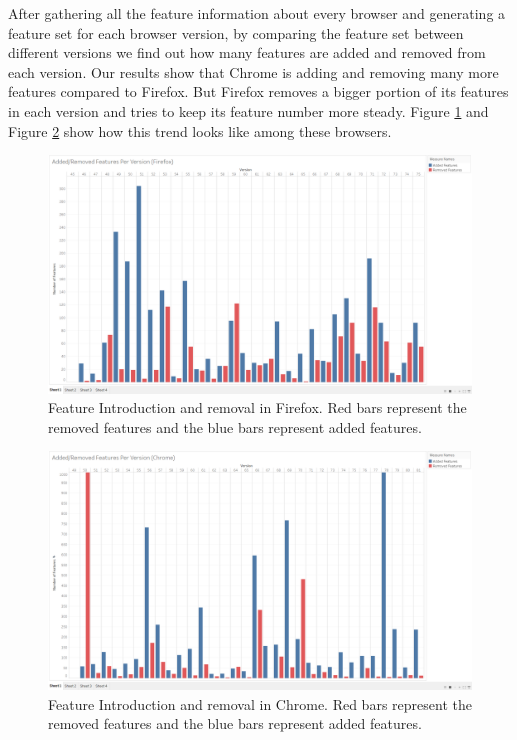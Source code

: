 After gathering all the feature information about every browser and generating a feature set for each browser version, by comparing the feature set between different versions we find out how many features are added and removed from each version. Our results show that Chrome is adding and removing many more features compared to Firefox. But Firefox removes a bigger portion of its features in each version and tries to keep its feature number more steady. Figure \ref{fig:ffaddremove} and Figure \ref{fig:chaddremove} show how this trend looks like among these browsers.

\begin{figure}[ht]
    \centering
    \includegraphics[width=\columnwidth]{figures/Firefox-add-remove.png}
    \caption{Feature Introduction and removal in Firefox. Red bars represent the removed features and the blue bars represent added features.}
    \label{fig:ffaddremove}
\end{figure}

\begin{figure}[ht]
    \centering
    \includegraphics[width=\columnwidth]{figures/Chrome-add-remove.png}
    \caption{Feature Introduction and removal in Chrome. Red bars represent the removed features and the blue bars represent added features.}
    \label{fig:chaddremove}
\end{figure}


